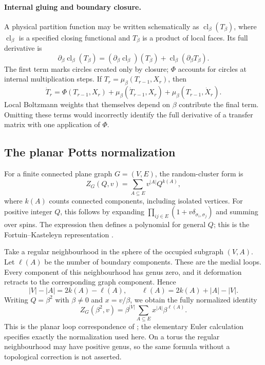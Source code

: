 \documentclass[a4paper,11pt,oneside,reqno]{amsart}
\theoremstyle{definition}
\numberwithin{equation}{section}
\begin{document}
\paragraph{Internal gluing and boundary closure.}
A physical partition function may be written schematically as
$\operatorname{cl}_\beta(T_\beta)$, where $\operatorname{cl}_\beta$ is a
specified closing functional and $T_\beta$ is a product of local faces.
Its full derivative is
\[
 \partial_\beta\operatorname{cl}_\beta(T_\beta)
 =(\partial_\beta\operatorname{cl}_\beta)(T_\beta)
   +\operatorname{cl}_\beta(\partial_\beta T_\beta).
\]
The first term marks circles created only by closure; $\Phi$ accounts
for circles at internal multiplication steps. If
$T_r=\mu_\beta(T_{r-1},X_r)$, then
\[
 \dot T_r=\Phi(T_{r-1},X_r)+\mu_\beta(\dot T_{r-1},X_r)
                  +\mu_\beta(T_{r-1},\dot X_r).
\]
Local Boltzmann weights that themselves depend on $\beta$ contribute
the final term. Omitting these terms would incorrectly identify the
full derivative of a transfer matrix with one application of $\Phi$.

\subsection{The planar Potts normalization}
For a finite connected plane graph $G=(V,E)$, the random-cluster form is
\begin{equation}\label{phys:FK}
 Z_G(Q,v)=\sum_{A\subseteq E}v^{|A|}Q^{k(A)},
\end{equation}
where $k(A)$ counts connected components, including isolated vertices.
For positive integer $Q$, this follows by expanding
$\prod_{ij\in E}(1+v\delta_{\sigma_i,\sigma_j})$ and summing over spins.
The expression then defines a polynomial for general $Q$; this is the
Fortuin--Kasteleyn representation \cite{FK}.

Take a regular neighbourhood in the sphere of the occupied subgraph
$(V,A)$. Let $\ell(A)$ be the number of boundary components. These are
the medial loops. Every component of this neighbourhood has genus zero,
and it deformation retracts to the corresponding graph component. Hence
\[
 |V|-|A|=2k(A)-\ell(A),\qquad
 \ell(A)=2k(A)+|A|-|V|.
\]
Writing $Q=\beta^2$ with $\beta\ne0$ and $x=v/\beta$, we obtain the
fully normalized identity
\begin{equation}\label{phys:Potts-loop}
 \boxed{Z_G(\beta^2,v)=
 \beta^{|V|}\sum_{A\subseteq E}x^{|A|}\beta^{\ell(A)}.}
\end{equation}
This is the planar loop correspondence of \cite{BKW}; the elementary
Euler calculation specifies exactly the normalization used here.
On a torus the regular neighbourhood may have positive genus, so the
same formula without a topological correction is not asserted.
\end{document}
